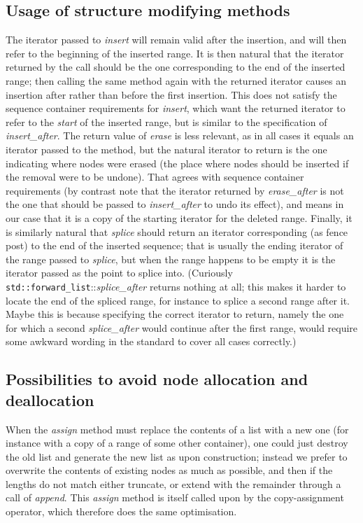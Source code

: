 \documentclass[12pt]{article}
\theoremstyle{plain}
\theoremstyle{definition}
\newcommand\std[1]{\texttt{std::#1}}
\def\frwl.{\std{forward\_list}}
\def\insa.{\textit{insert\_\!after}}
\def\ersa.{\textit{erase\_\!after}}
\def\spla.{\textit{splice\_\!after}}
\begin{document}
\subsection{Usage of structure modifying methods}

The iterator passed to \textit{insert} will remain valid after
the insertion, and will then refer to the beginning of the inserted range. It is
then natural that the iterator returned by the call should be the one
corresponding to the end of the inserted range; then calling the same method
again with the returned iterator causes an insertion after rather than before
the first insertion. This does not satisfy the sequence container requirements
for \textit{insert}, which want the returned iterator to refer to the
\emph{start} of the inserted range, but is similar to the specification of
\insa.. The return value of \textit{erase} is less relevant, as in all cases it
equals an iterator passed to the method, but the natural iterator to return is
the one indicating where nodes were erased (the place where nodes should be
inserted if the removal were to be undone). That agrees with sequence container
requirements (by contrast note that the iterator returned by \ersa. is not the
one that should be passed to \textit{insert\_after} to undo its effect), and
means in our case that it is a copy of the starting iterator for the deleted
range. Finally, it is similarly natural that \textit{splice} should return an
iterator corresponding (as fence post) to the end of the inserted sequence; that
is usually the ending iterator of the range passed to \textit{splice}, but when
the range happens to be empty it is the iterator passed as the point to splice
into. (Curiously \frwl.::\spla. returns nothing at all; this makes it harder to
locate the end of the spliced range, for instance to splice a second range after
it. Maybe this is because specifying the correct iterator to return, namely the
one for which a second \spla. would continue after the first range, would
require some awkward wording in the standard to cover all cases correctly.)

\subsection{Possibilities to avoid node allocation and deallocation}

When the \textit{assign} method must replace the contents of a list with a new
one (for instance with a copy of a range of some other container), one could
just destroy the old list and generate the new list as upon construction;
instead we prefer to overwrite the contents of existing nodes as much as
possible, and then if the lengths do not match either truncate, or extend with
the remainder through a call of \textit{append}. This \textit{assign} method is
itself called upon by the copy-assignment operator, which therefore does the
same optimisation.
\end{document}
